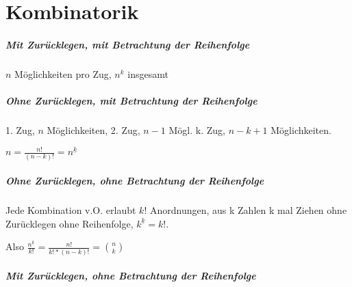 \chapter{Kombinatorik}
\paragraph{Mit Zurücklegen, mit Betrachtung der Reihenfolge}
$n$ Möglichkeiten pro Zug, $n^k$ insgesamt

\paragraph{Ohne Zurücklegen, mit Betrachtung der Reihenfolge}
1. Zug, $n$ Möglichkeiten, 2. Zug, $n-1$ Mögl. k. Zug, $n-k+1$ Möglichkeiten.

$n=\frac{n!}{(n-k)!}=n^{\underline k}$

\paragraph{Ohne Zurücklegen, ohne Betrachtung der Reihenfolge}
Jede Kombination v.O. erlaubt $k!$ Anordnungen, aus k Zahlen k mal Ziehen ohne Zurücklegen ohne Reihenfolge, $k^{\underline k}=k!$.

Also $\frac{n^{\underline k}}{k!}=\frac{n!}{k!*(n-k)!}=\binom nk$

\paragraph{Mit Zurücklegen, ohne Betrachtung der Reihenfolge}
